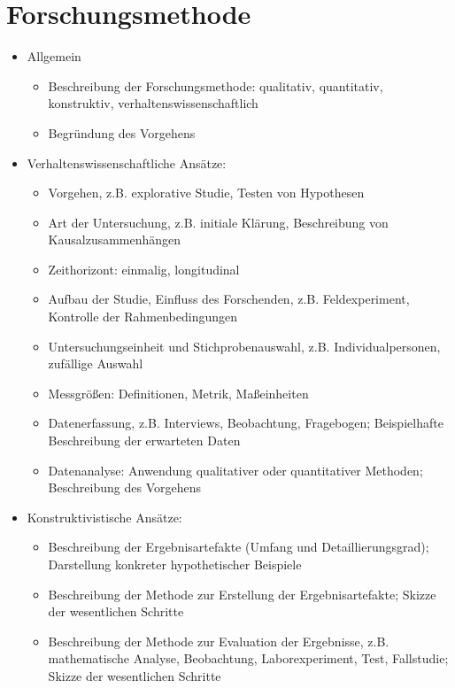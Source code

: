 \section{Forschungsmethode}
\label{sec:Forschungsmethode}
\begin{itemize}
  \item Allgemein
  \begin{itemize}
    \item Beschreibung der Forschungsmethode: qualitativ, quantitativ, konstruktiv, verhaltenswissenschaftlich
    \item Begründung des Vorgehens
  \end{itemize}
  \item Verhaltenswissenschaftliche Ansätze:
  \begin{itemize}
    \item Vorgehen, z.B. explorative Studie, Testen von Hypothesen
    \item Art der Untersuchung, z.B. initiale Klärung, Beschreibung von Kausalzusammenhängen
    \item Zeithorizont: einmalig, longitudinal 
    \item Aufbau der Studie, Einfluss des Forschenden, z.B. Feldexperiment, Kontrolle der Rahmenbedingungen
    \item Untersuchungseinheit und Stichprobenauswahl, z.B. Individualpersonen, zufällige Auswahl
    \item Messgrößen: Definitionen, Metrik, Maßeinheiten
    \item Datenerfassung, z.B. Interviews, Beobachtung, Fragebogen; Beispielhafte Beschreibung der erwarteten Daten
    \item Datenanalyse: Anwendung qualitativer oder quantitativer Methoden; Beschreibung des Vorgehens
  \end{itemize}
  \item Konstruktivistische Ansätze:
  \begin{itemize}  
    \item Beschreibung der Ergebnisartefakte (Umfang und Detaillierungsgrad); Darstellung konkreter hypothetischer Beispiele
    \item Beschreibung der Methode zur Erstellung der Ergebnisartefakte; Skizze der wesentlichen Schritte
    \item Beschreibung der Methode zur Evaluation der Ergebnisse, z.B. mathematische Analyse, Beobachtung, Laborexperiment, Test, Fallstudie; Skizze der wesentlichen Schritte 
  \end{itemize}
\end{itemize}